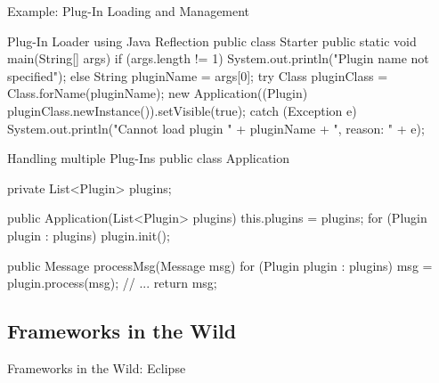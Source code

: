 \begin{frame}[fragile]{Example: Plug-In Loading and Management}
	\small\begin{mycolumns}[columns=2,widths={50,50}]
\begin{codetight}{Plug-In Loader using Java Reflection}
public class Starter {
	public static void main(String[] args) {
		if (args.length != 1)
			System.out.println("Plugin name not specified");
		else {
			String pluginName = args[0];
			try {
				Class pluginClass = Class.forName(pluginName);
				new Application((Plugin) 
					pluginClass.newInstance()).setVisible(true);
			} catch (Exception e) {
				System.out.println("Cannot load plugin " + 
					pluginName + ", reason: " + e);
			}
		}
	}
}
\end{codetight}
		\mynextcolumn
\begin{codetight}{Handling multiple Plug-Ins}
public class Application {
	private List<Plugin> plugins;

	public Application(List<Plugin> plugins) {
		this.plugins = plugins;
		for (Plugin plugin : plugins) {
			plugin.init();
		}
	}

	public Message processMsg(Message msg) {
		for (Plugin plugin : plugins) {
			msg = plugin.process(msg);
			// ...
		}
		return msg;
	}
}
\end{codetight}
	\end{mycolumns}
\end{frame}

\subsection{Frameworks in the Wild}
\begin{frame}{Frameworks in the Wild: Eclipse}
	\begin{mycolumns}[widths={70,30},animation=none]
	\mynextcolumn
		\vspace{-0.7cm}
		\pause
	\end{mycolumns}
\end{frame}

